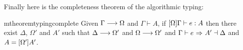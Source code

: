 Finally here is the completeness theorem of the algorithmic typing:

\begin{restatable}{mtheorem}{typingcomplete}  \label{thm:type_complete}
  Given $\Gamma \longrightarrow \Omega$ and $\Gamma \vdash A $, if
  $[\Omega]\Gamma \vdash e : A$ then there exist $\Delta$,
  $\Omega'$ and $A'$ such that $\Delta \longrightarrow \Omega'$ and $\Omega \longrightarrow \Omega'$
  and $\Gamma \vdash e {~\Rightarrow~} A' \dashv \Delta$ and $A = [\Omega']A'$.
\end{restatable}






